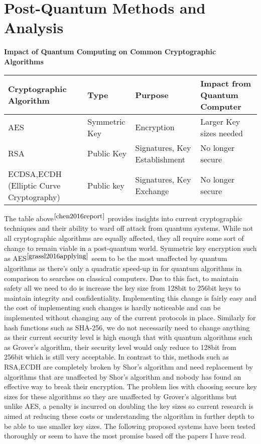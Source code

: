 \documentclass[10pt,a4paper]{IEEEtran}
\begin{document}
\section{Post-Quantum Methods and Analysis}
\begin{table*}
\begin{center}
	\textbf{Impact of Quantum Computing on Common Cryptographic Algorithms}
	\begin{tabular}{ | m{5cm} | m{2cm} | m{5cm} | m{4cm} | }
		\hline
		Cryptographic Algorithm & Type & Purpose & Impact from Quantum Computer \\
		\hline
		AES & Symmetric Key & Encryption & Larger Key sizes needed \\
		\hline
		RSA & Public Key & Signatures, Key Establishment & No longer secure \\
		\hline
		ECDSA,ECDH (Elliptic Curve Cryptography)  &Public key &Signatures, Key Exchange &No longer secure \\
		\hline
	\end{tabular}
\end{center}
\end{table*}
The table above\(^{\cite{chen2016report}}\) provides insights into current cryptographic techniques and their ability to ward off attack from quantum systems. While not all cryptographic algorithms are equally affected, they all require some sort of change to remain viable in a post-quantum world. Symmetric key encryption such as AES\(^{\cite{grassl2016applying}}\) seem to be the most unaffected by quantum algorithms as there's only a quadratic speed-up in for quantum algorithms in comparison to searches on classical computers. Due to this fact, to maintain safety all we need to do is increase the key size from 128bit to 256bit keys to maintain integrity and confidentiality. Implementing this change is fairly easy and the cost of implementing such changes is hardly noticeable and can be implemented without changing any of the current protocols in place. Similarly for hash functions such as SHA-256, we do not necessarily need to change anything as their current security level is high enough that with quantum algorithms such as Grover's algorithm, their security level would only reduce to 128bit from 256bit which is still very acceptable.
\newline
\newline
In contrast to this, methods such as RSA,ECDH are completely broken by Shor's algorithm and need replacement by algorithms that are unaffected by Shor's algorithm and nobody has found an effective way to break their encryption. The problem lies with choosing secure key sizes for these algorithms so they are unaffected by Grover's algorithms but unlike AES, a penalty is incurred on doubling the key sizes so current research is aimed at reducing these costs or understanding the algorithm in further depth to be able to use smaller key sizes. The following proposed systems have been tested thoroughly or seem to have the most promise based off the papers I have read.
\end{document}
